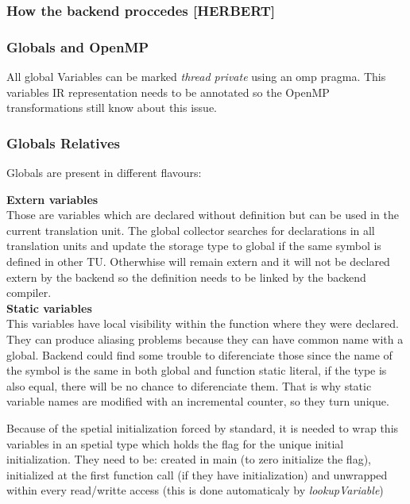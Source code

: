 \subsubsection{How the backend proccedes [HERBERT]}

\subsubsection{Globals and OpenMP}

All global Variables can be marked \textit{thread private} using an omp pragma. This variables IR
representation needs to be annotated so the OpenMP transformations still know about this issue.

\subsubsection{Globals Relatives}

Globals are present in different flavours:

\textbf{Extern variables}\\
	Those are variables which are declared without definition but can be used in the current
	translation unit. The global collector searches for declarations in all translation units and
	update the storage type to global if the same symbol is defined in other TU. Otherwhise will
	remain extern and it will not be declared extern by the backend so the definition needs to be
	linked by the backend compiler.\\
\textbf{Static variables}\\
	This variables have local visibility within the function where they were declared. They can
	produce aliasing problems because they can have common name with a global. Backend could find
	some trouble to diferenciate those since the name of the symbol is the same in both global and
	function static literal, if the type is also equal, there will be no chance to diferenciate
	them.
	That is why static variable names are modified with an incremental counter, so they turn unique.

	Because of the spetial initialization forced by standard, it is needed to wrap this variables in
	an spetial type which holds the flag for the unique initial initialization. 
	They need to be: created in main (to zero initialize the flag), initialized at the first
	function call (if they have initialization) and unwrapped within every read/writte access (this
	is done automaticaly by \textit{lookupVariable})

